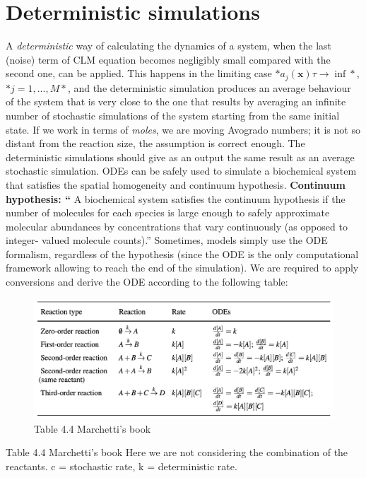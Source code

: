 \graphicspath{{chapters/05/images/}}
\chapter{Deterministic simulations}
A \emph{deterministic} way of calculating the dynamics of a system, when the last (noise) term of CLM equation becomes negligibly small compared with the second one, can be applied.
This happens in the limiting case $*a_j(\mathbf{x})\tau → \inf*$, $*j = 1,...,M*$, and the deterministic simulation produces an average behaviour of the system that is very close to the one that results by averaging an infinite number of stochastic simulations of the system starting from the same initial state.
If we work in terms of \emph{moles}, we are moving Avogrado numbers; it is not so distant from the reaction size, the assumption is correct enough.
The deterministic simulations should give as an output the same result as an average stochastic simulation.
ODEs can be safely used to simulate a biochemical system that satisfies the spatial homogeneity and continuum hypothesis.
\textbf{Continuum hypothesis: ``} A biochemical system satisfies the continuum hypothesis if the number of molecules for each species is large enough to safely approximate molecular abundances by concentrations that vary continuously (as opposed to integer- valued molecule counts).''
Sometimes, models simply use the ODE formalism, regardless of the hypothesis (since the ODE is the only computational framework allowing to reach the end of the simulation).
We are required to apply conversions and derive the ODE according to the following table:

\begin{figure}
  \centering
  \includegraphics{reaction_ODEs.png}
  \caption{Table 4.4 Marchetti's book}
\end{figure}

Table 4.4 Marchetti's book Here we are not considering the combination of the reactants.
c = stochastic rate, k = deterministic rate.

